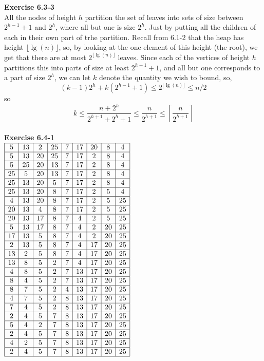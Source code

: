 \documentclass{article}
\begin{document}
\noindent\textbf{Exercise 6.3-3}\\

All the nodes of height $h$ partition the set of leaves into sets of size between $2^{h-1}+1$ and $2^h$, where all but one is size $2^h$. Just by putting all the children of each in their own part of trhe partition. Recall from 6.1-2 that the heap has height $\lfloor \lg(n)\rfloor$, so, by looking at the one element of this height (the root), we get that there are at most $ 2^{\lfloor \lg(n)\rfloor}$ leaves. Since each of the vertices of height $h$ partitions this into parts of size at least $2^{h-1}+1$, and all but one corresponds to a part of size $2^h$, we can let $k$ denote the quantity we wish to bound, so,
\[
(k-1)2^h + k(2^{h-1}+1) \le 2^{\lfloor \lg(n) \rfloor} \le n/2
\]
so
\[
k \le  \frac{n+2^h}{2^{h+1} + 2^{h}+1 }\le \frac{n}{2^{h+1}} \le \left\lceil \frac{n}{2^{h+1}}\right\rceil
\]\\

\noindent\textbf{Exercise 6.4-1}\\

$
\begin{array}{|c|c|c|c|c|c|c|c|c|}
\hline
5&13&2&25&7&17&20&8&4\\
\hline
5&13&20&25&7&17&2&8&4\\
\hline
5&25&20&13&7&17&2&8&4\\
\hline
25&5&20&13&7&17&2&8&4\\
\hline
25&13&20&5&7&17&2&8&4\\
\hline
25&13&20&8&7&17&2&5&4\\
\hline
4&13&20&8&7&17&2&5&25\\
\hline
20&13&4&8&7&17&2&5&25\\
\hline
20&13&17&8&7&4&2&5&25\\
\hline
5&13&17&8&7&4&2&20&25\\
\hline
17&13&5&8&7&4&2&20&25\\
\hline
2&13&5&8&7&4&17&20&25\\
\hline
13&2&5&8&7&4&17&20&25\\
\hline
13&8&5&2&7&4&17&20&25\\
\hline
4&8&5&2&7&13&17&20&25\\
\hline
8&4&5&2&7&13&17&20&25\\
\hline
8&7&5&2&4&13&17&20&25\\
\hline
4&7&5&2&8&13&17&20&25\\
\hline
7&4&5&2&8&13&17&20&25\\
\hline
2&4&5&7&8&13&17&20&25\\
\hline
5&4&2&7&8&13&17&20&25\\
\hline
2&4&5&7&8&13&17&20&25\\
\hline
4&2&5&7&8&13&17&20&25\\
\hline
2&4&5&7&8&13&17&20&25\\
\hline
\end{array}
$\\
\end{document}
